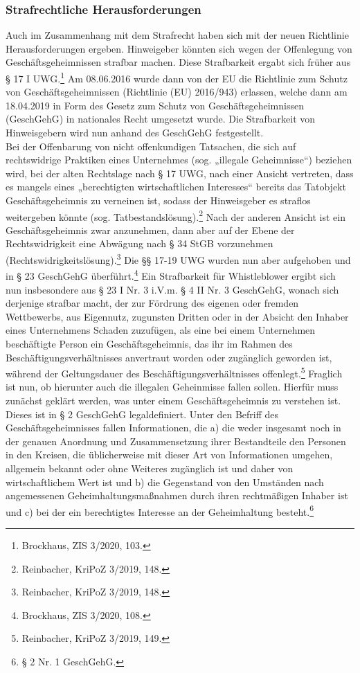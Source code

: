 \subsubsection{Strafrechtliche Herausforderungen}
Auch im Zusammenhang mit dem Strafrecht haben sich mit der neuen Richtlinie Herausforderungen ergeben.
Hinweigeber könnten sich wegen der Offenlegung von Geschäftsgeheimnissen strafbar machen.
Diese Strafbarkeit ergabt sich früher aus § 17 I UWG.\footnote{Brockhaus, ZIS 3/2020, 103.}
Am 08.06.2016 wurde dann von der EU die Richtlinie zum Schutz von Geschäftsgeheimnissen (Richtlinie (EU) 2016/943) erlassen, welche dann am 18.04.2019 in Form des Gesetz zum Schutz von Geschäftsgeheimnissen (GeschGehG) in nationales Recht umgesetzt wurde.
Die Strafbarkeit von Hinweisgebern wird nun anhand des GeschGehG festgestellt.\\
Bei der Offenbarung von nicht offenkundigen Tatsachen, die sich auf rechtswidrige Praktiken eines Unternehmes (sog. „illegale Geheimnisse“) beziehen wird, bei der alten Rechtslage nach § 17 UWG, nach einer Ansicht vertreten, dass es mangels eines „berechtigten wirtschaftlichen Interesses“ bereits das Tatobjekt Geschäftsgeheimnis zu verneinen ist, sodass der Hinweisgeber es straflos weitergeben könnte (sog. Tatbestandslösung).\footnote{Reinbacher, KriPoZ 3/2019, 148.}
Nach der anderen Ansicht ist ein Geschäftsgeheimnis zwar anzunehmen, dann aber auf der Ebene der Rechtswidrigkeit eine Abwägung nach § 34 StGB vorzunehmen (Rechtswidrigkeitslösung).\footnote{Reinbacher, KriPoZ 3/2019, 148.}
Die §§ 17-19 UWG wurden nun aber aufgehoben und in § 23 GeschGehG überführt.\footnote{Brockhaus, ZIS 3/2020, 108.}
Ein Strafbarkeit für Whistleblower ergibt sich nun insbesondere aus § 23 I Nr. 3 i.V.m. § 4 II Nr. 3 GeschGehG, wonach sich derjenige strafbar macht, der zur Fördrung des eigenen oder fremden Wettbewerbs, aus Eigennutz, zugunsten Dritten oder in der Absicht den Inhaber eines Unternehmens Schaden zuzufügen, als eine bei einem Unternehmen beschäftigte Person ein Geschäftsgeheimnis, das ihr im Rahmen des Beschäftigungsverhältnisses anvertraut worden oder zugänglich geworden ist, während der Geltungsdauer des Beschäftigungsverhältnisses offenlegt.\footnote{Reinbacher, KriPoZ 3/2019, 149.}
Fraglich ist nun, ob hierunter auch die illegalen Geheinmisse fallen sollen.
Hierfür muss zunächst geklärt werden, was unter einem Geschäftsgeheimnis zu verstehen ist.
Dieses ist in § 2 GeschGehG legaldefiniert.
Unter den Befriff des Geschäftsgeheimnisses fallen Informationen, die a) die weder insgesamt noch in der genauen Anordnung und Zusammensetzung ihrer Bestandteile den Personen in den Kreisen, die üblicherweise mit dieser Art von Informationen umgehen, allgemein bekannt oder ohne Weiteres zugänglich ist und daher von wirtschaftlichem Wert ist und b) die Gegenstand von den Umständen nach angemessenen Geheimhaltungsmaßnahmen durch ihren rechtmäßigen Inhaber ist und c) bei der ein berechtigtes Interesse an der Geheimhaltung besteht.\footnote{§ 2 Nr. 1 GeschGehG.}\\
